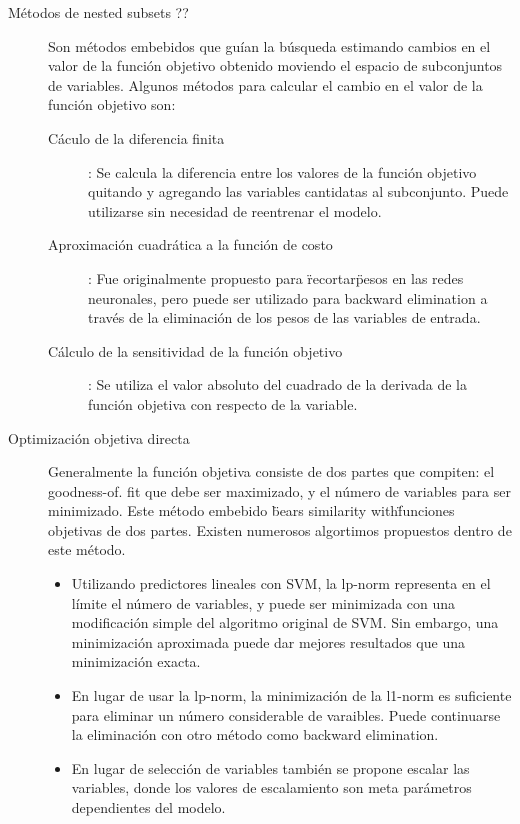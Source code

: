 \documentclass[11pt,spanish]{article}
\begin{document}
\begin{description}
    \item[Métodos de nested subsets ??] Son métodos embebidos que
    guían la búsqueda estimando cambios en el valor de la función
    objetivo obtenido moviendo el espacio de subconjuntos de
    variables. Algunos métodos para calcular el cambio en el valor de la función objetivo son:
    \begin{description}
        \item[Cáculo de la diferencia finita]: Se calcula la
        diferencia entre los valores de la función objetivo
        quitando y agregando las variables cantidatas al
        subconjunto. Puede utilizarse sin necesidad de reentrenar
        el modelo.
        \item[Aproximación cuadrática a la función de costo]: Fue
        originalmente propuesto para \"recortar\" pesos en las
        redes neuronales, pero puede ser utilizado para backward
        elimination a través de la eliminación de los pesos de
        las variables de entrada.
        \item[Cálculo de la sensitividad de la función objetivo]:
        Se utiliza el valor absoluto del cuadrado de la derivada
        de la función objetiva con respecto de la variable.
    \end{description}

    \item[Optimización objetiva directa] Generalmente la función
    objetiva consiste de dos partes que compiten: el goodness-of.
    fit que debe ser maximizado, y el número de variables para
    ser minimizado. Este método embebido \"bears similarity with\"
    funciones objetivas de dos partes. Existen numerosos
    algortimos propuestos dentro de este método.
    \begin{itemize}
        \item Utilizando predictores lineales con SVM, la lp-norm
        representa en el límite el número de variables, y puede
        ser minimizada con una modificación simple del algoritmo
        original de SVM. Sin embargo, una minimización aproximada
        puede dar mejores resultados que una minimización exacta.
        \item En lugar de usar la lp-norm, la minimización de la
        l1-norm es suficiente para eliminar un número
        considerable de varaibles. Puede continuarse la
        eliminación con otro método como backward elimination.
        \item En lugar de selección de variables también se
        propone escalar las variables, donde los valores de
        escalamiento son meta parámetros dependientes del modelo.
    \end{itemize}


\end{description}
\end{document}
